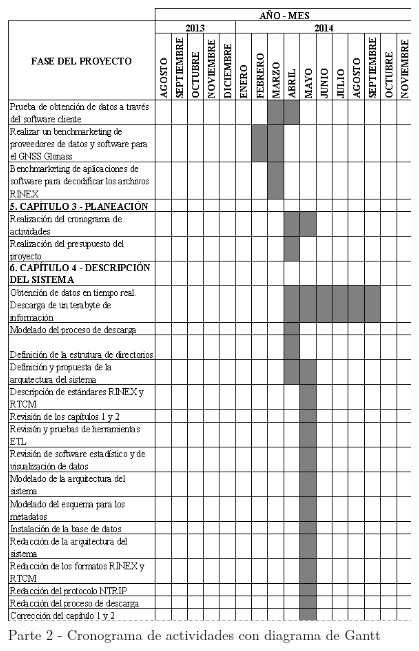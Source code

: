 \begin{figure}[H]
\centering
\includegraphics[width=0.95\textwidth]{images/Gantt_2}
\caption{Parte 2 - Cronograma de actividades con diagrama de Gantt}
\label{fig:3.2}
\end{figure}

